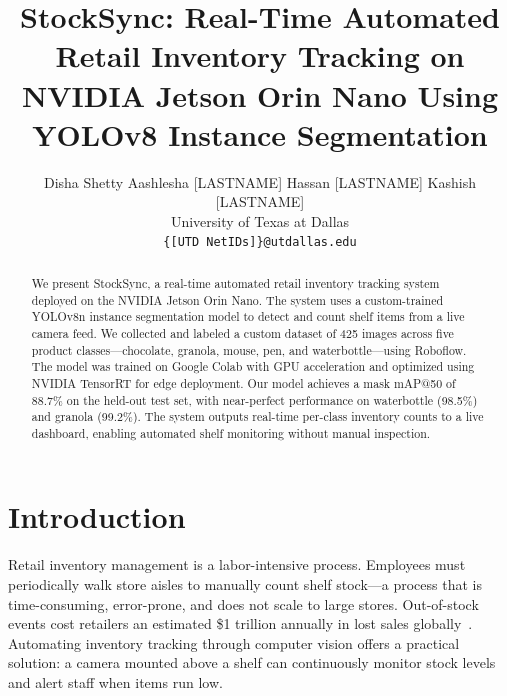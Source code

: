 \documentclass[10pt,twocolumn,letterpaper]{article}
\begin{document}
\title{StockSync: Real-Time Automated Retail Inventory Tracking on\\
NVIDIA Jetson Orin Nano Using YOLOv8 Instance Segmentation}

\author{
Disha Shetty \quad Aashlesha [LASTNAME] \quad Hassan [LASTNAME] \quad Kashish [LASTNAME]\\
University of Texas at Dallas\\
{\tt\small \{[UTD NetIDs]\}@utdallas.edu}
}

\maketitle

\begin{abstract}
We present StockSync, a real-time automated retail inventory
tracking system deployed on the NVIDIA Jetson Orin Nano.
The system uses a custom-trained YOLOv8n instance segmentation
model to detect and count shelf items from a live camera feed.
We collected and labeled a custom dataset of 425 images across
five product classes---chocolate, granola, mouse, pen, and
waterbottle---using Roboflow. The model was trained on Google
Colab with GPU acceleration and optimized using NVIDIA TensorRT
for edge deployment. Our model achieves a mask mAP@50 of
88.7\% on the held-out test set, with near-perfect performance
on waterbottle (98.5\%) and granola (99.2\%). The system
outputs real-time per-class inventory counts to a live
dashboard, enabling automated shelf monitoring without manual
inspection.
\end{abstract}

\section{Introduction}

Retail inventory management is a labor-intensive process.
Employees must periodically walk store aisles to manually
count shelf stock---a process that is time-consuming,
error-prone, and does not scale to large stores. Out-of-stock
events cost retailers an estimated \$1 trillion annually in
lost sales globally~\cite{gruen2002retail}. Automating
inventory tracking through computer vision offers a practical
solution: a camera mounted above a shelf can continuously
monitor stock levels and alert staff when items run low.
\end{document}

